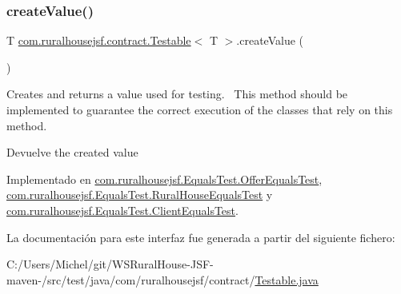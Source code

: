 \subsubsection{\texorpdfstring{createValue()}{createValue()}}
{\footnotesize\ttfamily T \mbox{\hyperlink{interfacecom_1_1ruralhousejsf_1_1contract_1_1_testable}{com.\+ruralhousejsf.\+contract.\+Testable}}$<$ T $>$.create\+Value (\begin{DoxyParamCaption}{ }\end{DoxyParamCaption})}

Creates and returns a value used for testing.~\newline
 This method should be implemented to guarantee the correct execution of the classes that rely on this method.

\begin{DoxyReturn}{Devuelve}
the created value 
\end{DoxyReturn}


Implementado en \mbox{\hyperlink{classcom_1_1ruralhousejsf_1_1_equals_test_1_1_offer_equals_test_a25524d0ab8278899774751c0f7630e8d}{com.\+ruralhousejsf.\+Equals\+Test.\+Offer\+Equals\+Test}}, \mbox{\hyperlink{classcom_1_1ruralhousejsf_1_1_equals_test_1_1_rural_house_equals_test_abcab55b3e63c8d5511f04e395ff0f111}{com.\+ruralhousejsf.\+Equals\+Test.\+Rural\+House\+Equals\+Test}} y \mbox{\hyperlink{classcom_1_1ruralhousejsf_1_1_equals_test_1_1_client_equals_test_aa74f54ea042862db1a5499d31ec75539}{com.\+ruralhousejsf.\+Equals\+Test.\+Client\+Equals\+Test}}.



La documentación para este interfaz fue generada a partir del siguiente fichero\+:\begin{DoxyCompactItemize}
\item 
C\+:/\+Users/\+Michel/git/\+W\+S\+Rural\+House-\/\+J\+S\+F-\/maven-\//src/test/java/com/ruralhousejsf/contract/\mbox{\hyperlink{_testable_8java}{Testable.\+java}}\end{DoxyCompactItemize}
